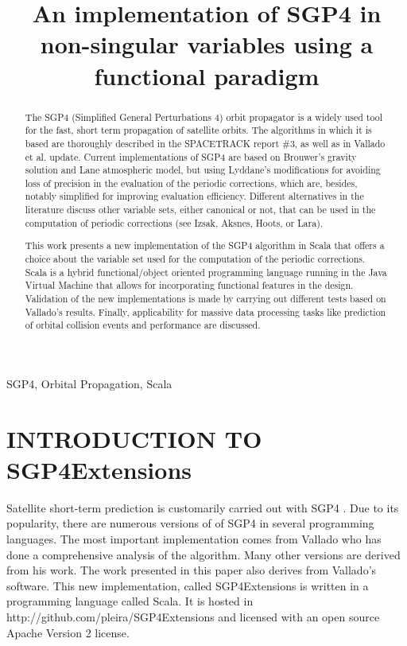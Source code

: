 \documentclass{article}
\title{An implementation of SGP4 in non-singular variables using a functional paradigm}
\begin{document}
%
\maketitle
%
\begin{abstract}
The SGP4 (Simplified General Perturbations 4) orbit propagator is a widely used tool for the fast, short term propagation of satellite orbits. The algorithms in which it is based are thoroughly described in the SPACETRACK report \#3, as well as in Vallado et al. update. Current implementations of SGP4 are based on Brouwer's gravity solution and Lane atmospheric model, but using Lyddane's modifications for avoiding loss of precision in the evaluation of the periodic corrections, which are, besides, notably simplified for improving evaluation efficiency. Different alternatives in the literature discuss other variable sets, either canonical or not, that can be used in the computation of periodic corrections (see Izsak, Aksnes, Hoots, or Lara).

This work presents a new implementation of the SGP4 algorithm in Scala that offers
a choice about the variable set used for the computation of the periodic corrections.
Scala is a hybrid functional/object oriented programming language running in the Java Virtual Machine
that allows for incorporating functional features in the design.
Validation of the new implementations is made by carrying out different tests based on Vallado's results. Finally, applicability for massive data processing tasks like prediction of orbital collision events and performance are discussed.

\end{abstract}
%
\begin{keywords}
SGP4, Orbital Propagation, Scala
\end{keywords}
%
\section{INTRODUCTION TO SGP4Extensions}
\label{sec:intro}

Satellite short-term prediction is customarily carried out
with SGP4 \cite{}. Due to its popularity, there are numerous versions of
of SGP4 in several programming languages. The most important implementation comes from Vallado
\cite{ValladoCrawford06}
who has done a comprehensive analysis of the algorithm. Many other versions
are derived from his work. The work presented in this paper also derives from Vallado's software.
This new implementation, called SGP4Extensions is written in a programming language called Scala.
It is hosted in http://github.com/pleira/SGP4Extensions and licensed
with an open source Apache Version 2 license.
\end{document}
